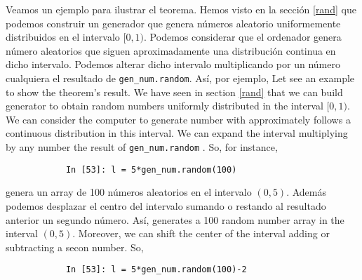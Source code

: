 \begin{paracol}{2}
Veamos un ejemplo para ilustrar el teorema. Hemos visto en la sección \ref{rand} que podemos construir un generador que genera números aleatorio uniformemente distribuidos en el intervalo $[0,1)$. Podemos considerar que el ordenador genera número aleatorios que siguen aproximadamente una distribución continua en dicho intervalo. Podemos alterar dicho intervalo multiplicando por un número cualquiera el resultado de \texttt{gen\_num.random}. Así, por ejemplo,
\switchcolumn
Let see an example to show the theorem's result. We have seen in section \ref{rand} that we can build generator to obtain random numbers uniformly distributed in the interval $[0,1)$. We can consider the computer to generate number with approximately follows a continuous distribution in this interval. We can expand the interval multiplying by any number the result of \texttt{gen\_num.random} . So, for instance, 
\end{paracol}
\begin{center}
	\begin{minipage}{\textwidth}
		\begin{verbatim}
			In [53]: l = 5*gen_num.random(100)
		\end{verbatim}
	\end{minipage}
\end{center}

\begin{paracol}{2}
genera un array de 100 números aleatorios en el intervalo $(0,5)$.
Además podemos desplazar el centro del intervalo sumando o restando al resultado anterior un segundo número. Así,
\switchcolumn
generates a 100 random number array in the interval $(0,5)$.
Moreover, we can shift the center of the interval adding or subtracting a secon number. So, 
\end{paracol}


\begin{center}
	\begin{minipage}{\textwidth}
		\begin{verbatim}
			In [53]: l = 5*gen_num.random(100)-2
		\end{verbatim}
	\end{minipage}
\end{center}

